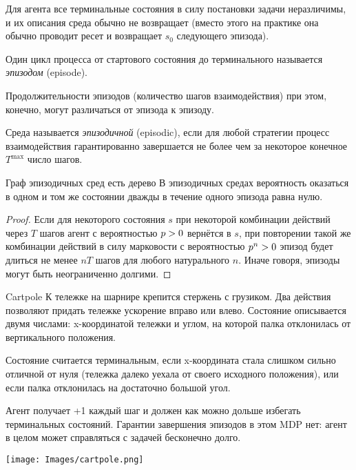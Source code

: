 \begin{remark}
Для агента все терминальные состояния в силу постановки задачи неразличимы, и их описания среда обычно не возвращает (вместо этого на практике она обычно проводит ресет и возвращает $s_0$ следующего эпизода).
\end{remark}

\begin{definition}
Один цикл процесса от стартового состояния до терминального называется \emph{эпизодом} (episode).
\end{definition}

Продолжительности эпизодов (количество шагов взаимодействия) при этом, конечно, могут различаться от эпизода к эпизоду.

\begin{definition}
Среда называется \emph{эпизодичной} (episodic), если для любой стратегии процесс взаимодействия гарантированно завершается не более чем за некоторое конечное $T^{\max}$ число шагов.
\end{definition}

\begin{theoremBox}[label=th:episodicmdpistree]{Граф эпизодичных сред есть дерево}
В эпизодичных средах вероятность оказаться в одном и том же состоянии дважды в течение одного эпизода равна нулю.
\begin{proof}
Если для некоторого состояния $s$ при некоторой комбинации действий через $T$ шагов агент с вероятностью $p \HM> 0$ вернётся в $s$, при повторении такой же комбинации действий в силу марковости с вероятностью $p^n \HM> 0$ эпизод будет длиться не менее $nT$ шагов для любого натурального $n$. Иначе говоря, эпизоды могут быть неограниченно долгими. 
\end{proof}
\end{theoremBox}

\begin{exampleBox}[righthand ratio=0.25, sidebyside, sidebyside align=center, lower separated=false]{Cartpole}
К тележке на шарнире крепится стержень с грузиком. Два действия позволяют придать тележке ускорение вправо или влево. Состояние описывается двумя числами: x-координатой тележки и углом, на которой палка отклонилась от вертикального положения.

Состояние считается терминальным, если x-координата стала слишком сильно отличной от нуля (тележка далеко уехала от своего исходного положения), или если палка отклонилась на достаточно большой угол.

Агент получает +1 каждый шаг и должен как можно дольше избегать терминальных состояний. Гарантии завершения эпизодов в этом MDP нет: агент в целом может справляться с задачей бесконечно долго.

\tcblower
\texttt{[image: Images/cartpole.png]}
\end{exampleBox}

